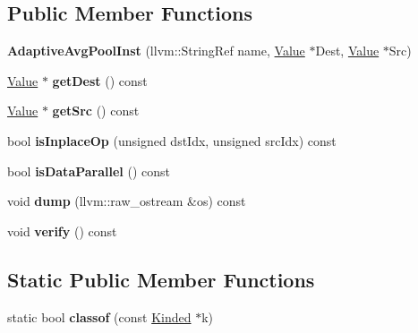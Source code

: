 \subsection*{Public Member Functions}
\begin{DoxyCompactItemize}
\item 
\mbox{\label{classglow_1_1_adaptive_avg_pool_inst_ab23853b483b054031f4ae24e8a171b6c}} 
{\bfseries Adaptive\+Avg\+Pool\+Inst} (llvm\+::\+String\+Ref name, \hyperlink{classglow_1_1_value}{Value} $\ast$Dest, \hyperlink{classglow_1_1_value}{Value} $\ast$Src)
\item 
\mbox{\label{classglow_1_1_adaptive_avg_pool_inst_a811fa69455e0e88c38f885f1e4b3598d}} 
\hyperlink{classglow_1_1_value}{Value} $\ast$ {\bfseries get\+Dest} () const
\item 
\mbox{\label{classglow_1_1_adaptive_avg_pool_inst_a2df359d1194fbce99a5fce2bb520d227}} 
\hyperlink{classglow_1_1_value}{Value} $\ast$ {\bfseries get\+Src} () const
\item 
\mbox{\label{classglow_1_1_adaptive_avg_pool_inst_a5054ccf9b0638f65d8223bed7a39bc69}} 
bool {\bfseries is\+Inplace\+Op} (unsigned dst\+Idx, unsigned src\+Idx) const
\item 
\mbox{\label{classglow_1_1_adaptive_avg_pool_inst_ad671cb78ae52f61b6f866ef524ce96a9}} 
bool {\bfseries is\+Data\+Parallel} () const
\item 
\mbox{\label{classglow_1_1_adaptive_avg_pool_inst_abeb0ba23de140e1e67ab87a411613fda}} 
void {\bfseries dump} (llvm\+::raw\+\_\+ostream \&os) const
\item 
\mbox{\label{classglow_1_1_adaptive_avg_pool_inst_a4b37bb9b1c66af83760e16730d366940}} 
void {\bfseries verify} () const
\end{DoxyCompactItemize}
\subsection*{Static Public Member Functions}
\begin{DoxyCompactItemize}
\item 
\mbox{\label{classglow_1_1_adaptive_avg_pool_inst_a59eba9daaef7eaf9410f76753fe9b88b}} 
static bool {\bfseries classof} (const \hyperlink{classglow_1_1_kinded}{Kinded} $\ast$k)
\end{DoxyCompactItemize}
